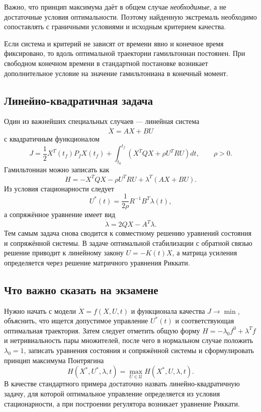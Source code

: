 Важно, что принцип максимума даёт в общем случае \emph{необходимые}, а не
достаточные условия оптимальности. Поэтому найденную экстремаль необходимо
сопоставлять с граничными условиями и исходным критерием качества.

Если система и критерий не зависят от времени явно и конечное время фиксировано,
то вдоль оптимальной траектории гамильтониан постоянен. При свободном конечном
времени в стандартной постановке возникает дополнительное условие на значение
гамильтониана в конечный момент.

\subsection{Линейно-квадратичная задача}

Один из важнейших специальных случаев --- линейная система
\[
    \dot X=AX+BU
\]
с квадратичным функционалом
\[
    J=\frac12 X^T(t_f)P_fX(t_f)+
    \int_{t_0}^{t_f}\left(X^TQX+\rho U^TRU\right)dt,
    \qquad \rho>0.
\]
Гамильтониан можно записать как
\[
    H=-X^TQX-\rho U^TRU+\lambda^T(AX+BU).
\]
Из условия стационарности следует
\[
    U^*(t)=\frac{1}{2\rho}R^{-1}B^T\lambda(t),
\]
а сопряжённое уравнение имеет вид
\[
    \dot\lambda=2QX-A^T\lambda.
\]
Тем самым задача снова сводится к совместному решению уравнений состояния и
сопряжённой системы. В задаче оптимальной стабилизации с обратной связью решение
приводит к линейному закону $U=-K(t)X$, а матрица усиления определяется через
решение матричного уравнения Риккати.

\subsection{Что важно сказать на экзамене}

Нужно начать с модели $\dot X=f(X,U,t)$ и функционала качества $J\to\min$,
объяснить, что ищется допустимое управление $U^*(t)$ и соответствующая
оптимальная траектория. Затем следует отметить общую форму $H=-\lambda_0f^0+\lambda^Tf$ и
нетривиальность пары множителей, после чего в нормальном случае положить
$\lambda_0=1$, записать уравнения состояния и сопряжённой системы и
сформулировать принцип максимума Понтрягина
\[
    H(X^*,U^*,\lambda,t)=\max_{U\in\mathcal U}H(X^*,U,\lambda,t).
\]
В качестве стандартного примера достаточно назвать линейно-квадратичную задачу,
для которой оптимальное управление определяется из условия стационарности, а
при построении регулятора возникает уравнение Риккати.

\newpage
